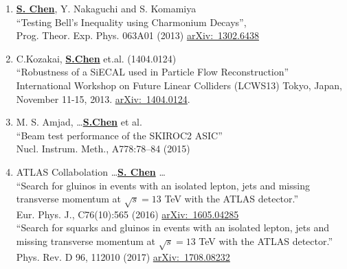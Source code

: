 \documentclass[12pt]{article}
\begin{document}
\begin{enumerate}
	\item \underline{\textbf{S. Chen}}, Y. Nakaguchi and S. Komamiya \\
			``Testing Bell's Inequality using Charmonium Decays'',  \\
			Prog. Theor. Exp. Phys. 063A01 (2013) \label{Pub::BI2013_PTEP}
                         \href{https://arxiv.org/abs/1302.6438}{arXiv:~1302.6438}
%
	\item C.Kozakai, \underline{\textbf{S.Chen}} et.al. (1404.0124)	\\
          ``Robustness of a SiECAL used in Particle Flow Reconstruction'' \\
	  International Workshop on Future Linear Colliders (LCWS13) Tokyo, Japan, November 11-15, 2013. \label{Pub::ECAL_LCWS2013} \href{https://arxiv.org/abs/1404.0124}{arXiv:~1404.0124}.
%
        \item M. S. Amjad, \dots \underline{\textbf{S.Chen}} et al. \\
              ``Beam test performance of the SKIROC2 ASIC'' \\
                Nucl. Instrum. Meth., A778:78–84 (2015) \label{Pub:SKIROC2015}
%
	\item ATLAS Collabolation  \dots \underline{\textbf{S. Chen}} \dots \\
		   ``Search for gluinos in events with an isolated lepton, jets and missing transverse momentum at $\sqrt{s}= 13$ TeV with the ATLAS detector.'' \\
	             Eur. Phys. J., C76(10):565 (2016)    \href{https://arxiv.org/abs/1605.04285}{arXiv:~1605.04285} \\
		   ``Search for squarks and gluinos in events with an isolated lepton, jets and missing transverse momentum at $\sqrt{s}=13$ TeV with the ATLAS detector.'' \\
		    Phys. Rev. D 96, 112010 (2017)      \href{https://arxiv.org/abs/1708.08232}{arXiv:~1708.08232}  \label{Pub::ATLPaper_Incl1L}
%
%

\end{enumerate}
\end{document}
